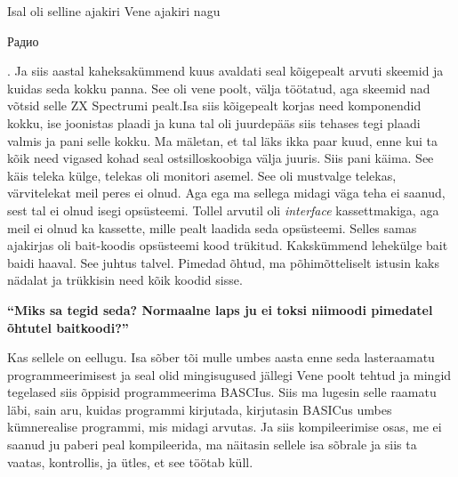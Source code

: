 Isal oli selline ajakiri Vene ajakiri nagu
\begin{russian}Радио\end{russian}. Ja siis aastal kaheksakümmend kuus
avaldati seal kõigepealt arvuti skeemid ja kuidas seda kokku panna. See oli
vene poolt, välja töötatud, aga skeemid nad võtsid selle ZX Spectrumi
pealt.Isa siis kõigepealt korjas need komponendid kokku,
ise joonistas plaadi ja kuna tal oli juurdepääs siis tehases tegi plaadi valmis
ja pani selle kokku. Ma mäletan, et tal läks ikka paar kuud, enne kui ta kõik
need vigased kohad seal ostsilloskoobiga välja juuris. Siis pani käima. See
käis teleka külge, telekas oli monitori asemel. See oli mustvalge telekas,
värvitelekat meil peres ei olnud. Aga ega ma sellega midagi väga teha ei
saanud, sest tal ei olnud isegi opsüsteemi. Tollel arvutil oli \emph{interface}
kassettmakiga, aga meil ei olnud ka kassette, mille pealt laadida seda
opsüsteemi. Selles samas ajakirjas oli bait-koodis opsüsteemi kood trükitud.
Kakskümmend lehekülge bait baidi haaval. See juhtus talvel. Pimedad õhtud, ma
põhimõtteliselt istusin kaks nädalat ja trükkisin need kõik koodid sisse.

\textbf{\enquote{Miks sa tegid seda? Normaalne laps ju ei toksi niimoodi pimedatel õhtutel baitkoodi?}}

Kas sellele on eellugu. Isa sõber tõi mulle umbes aasta enne seda lasteraamatu
programmeerimisest ja seal olid mingisugused jällegi Vene poolt tehtud ja
mingid tegelased siis õppisid programmeerima BASCIus. Siis
ma lugesin selle raamatu läbi, sain aru, kuidas programmi kirjutada, kirjutasin
BASICus umbes kümnerealise programmi, mis midagi arvutas. Ja siis
kompileerimise osas, me ei saanud ju paberi peal kompileerida, ma näitasin
sellele isa sõbrale ja siis ta vaatas, kontrollis, ja ütles, et see töötab
küll.

